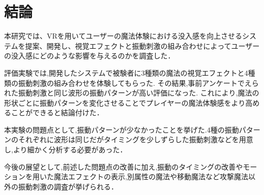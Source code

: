 \chapter{結論}
本研究では、VRを用いてユーザーの魔法体験における没入感を向上させるシステムを提案、開発し、視覚エフェクトと振動刺激の組み合わせによってユーザーの没入感にどのような影響を与えるのかを調査した．

評価実験では,開発したシステムで被験者に3種類の魔法の視覚エフェクトと4種類の振動刺激の組み合わせを体験してもらった.
その結果,事前アンケートでえられた振動刺激と同じ波形の振動パターンが高い評価になった.
これにより,魔法の形状ごとに振動パターンを変化させることでプレイヤーの魔法体験感をより高めることができると結論付けた．

本実験の問題点として,振動パターンが少なかったことを挙げた.4種の振動パターンのそれぞれに波形は同じだがタイミングを少しずらした振動刺激などを用意し,より細かく分析する必要があった．

今後の展望として,前述した問題点の改善に加え,振動のタイミングの改善やモーションを用いた魔法エフェクトの表示,別属性の魔法や移動魔法など攻撃魔法以外の振動刺激の調査が挙げられる．
  